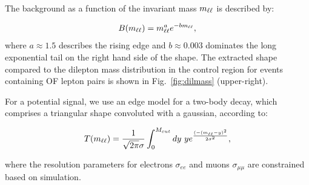 The background as a function of the invariant mass $m_{\ell\ell}$ is described by:

\begin{equation}
B(m_{\ell\ell}) = m_{\ell\ell}^a e^{-b m_{\ell\ell}},
\end{equation}
where $a\approx1.5$ describes the rising edge and $b\approx0.003$
dominates the long exponential tail on the right hand side of the 
shape. The extracted shape compared to the dilepton mass distribution in the control region
for events containing OF lepton pairs is shown in Fig.~\ref{fig:dilmass} (upper-right).

For a potential signal, we use an edge model for a two-body decay, 
which comprises a triangular shape convoluted with a gaussian,
according to:

\begin{equation}
T(m_{\ell\ell}) = \frac{1}{\sqrt{2\pi}\sigma}\int_0^{M_{cut}} dy~y e^{\frac{(-(m_{\ell\ell}-y)^2}{2\sigma^2}},
\end{equation}

where the resolution parameters for electrons $\sigma_{ee}$ and muons $\sigma_{\mu\mu}$ are constrained 
based on simulation.

